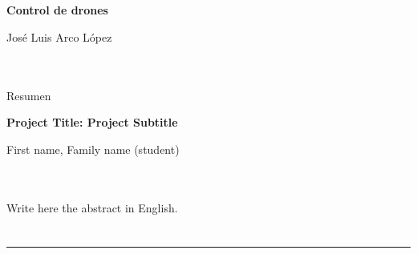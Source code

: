 \chapter*{}






\cleardoublepage
\thispagestyle{empty}

\begin{center}
{\large\bfseries Control de drones }\\
\end{center}
\begin{center}
José Luis Arco López\\
\end{center}

\\

\vspace{0.7cm}
\\

Resumen
\cleardoublepage


\thispagestyle{empty}


\begin{center}
{\large\bfseries Project Title: Project Subtitle}\\
\end{center}
\begin{center}
First name, Family name (student)\\
\end{center}

\\

\vspace{0.7cm}
\\

Write here the abstract in English.

\chapter*{}
\thispagestyle{empty}

\noindent\rule[-1ex]{\textwidth}{2pt}\\[4.5ex]

